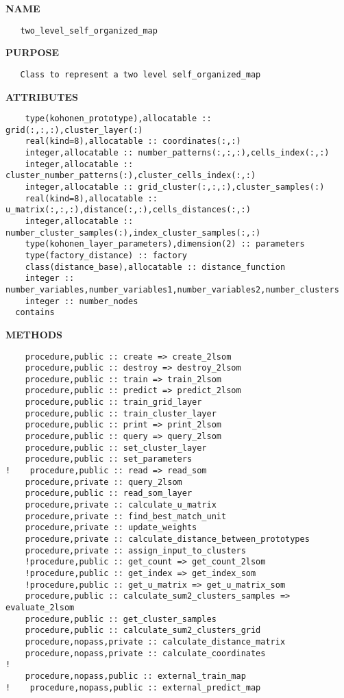 \documentclass{article}
\begin{document}
\label{ch:robo81}
\label{ch:two_level_self_organized_map_utilities_two_level_self_organized_map}
\textbf{NAME}
\begin{verbatim}
   two_level_self_organized_map
\end{verbatim}
\textbf{PURPOSE}
\begin{verbatim}
   Class to represent a two level self_organized_map
\end{verbatim}
\textbf{ATTRIBUTES}
\begin{verbatim}
    type(kohonen_prototype),allocatable :: grid(:,:,:),cluster_layer(:)
    real(kind=8),allocatable :: coordinates(:,:)
    integer,allocatable :: number_patterns(:,:,:),cells_index(:,:)
    integer,allocatable :: cluster_number_patterns(:),cluster_cells_index(:,:)
    integer,allocatable :: grid_cluster(:,:,:),cluster_samples(:)
    real(kind=8),allocatable :: u_matrix(:,:,:),distance(:,:),cells_distances(:,:)
    integer,allocatable :: number_cluster_samples(:),index_cluster_samples(:,:)
    type(kohonen_layer_parameters),dimension(2) :: parameters
    type(factory_distance) :: factory
    class(distance_base),allocatable :: distance_function
    integer :: number_variables,number_variables1,number_variables2,number_clusters
    integer :: number_nodes
  contains
\end{verbatim}
\textbf{METHODS}
\begin{verbatim}
    procedure,public :: create => create_2lsom
    procedure,public :: destroy => destroy_2lsom
    procedure,public :: train => train_2lsom
    procedure,public :: predict => predict_2lsom
    procedure,public :: train_grid_layer
    procedure,public :: train_cluster_layer
    procedure,public :: print => print_2lsom
    procedure,public :: query => query_2lsom
    procedure,public :: set_cluster_layer
    procedure,public :: set_parameters
!    procedure,public :: read => read_som
    procedure,private :: query_2lsom
    procedure,public :: read_som_layer
    procedure,private :: calculate_u_matrix
    procedure,private :: find_best_match_unit
    procedure,private :: update_weights
    procedure,private :: calculate_distance_between_prototypes
    procedure,private :: assign_input_to_clusters
    !procedure,public :: get_count => get_count_2lsom
    !procedure,public :: get_index => get_index_som
    !procedure,public :: get_u_matrix => get_u_matrix_som
    procedure,public :: calculate_sum2_clusters_samples => evaluate_2lsom
    procedure,public :: get_cluster_samples
    procedure,public :: calculate_sum2_clusters_grid
    procedure,nopass,private :: calculate_distance_matrix
    procedure,nopass,private :: calculate_coordinates
!    
    procedure,nopass,public :: external_train_map
!    procedure,nopass,public :: external_predict_map    
\end{verbatim}
\newpage
\end{document}
